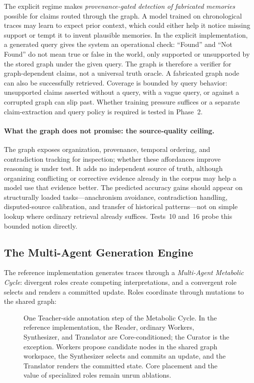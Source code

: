 The explicit regime makes \emph{provenance-gated detection of fabricated
memories} possible for claims routed through the graph. A model trained on
chronological traces may learn to expect prior context, which could either
help it notice missing support or tempt it to invent plausible memories. In the explicit implementation, a generated query gives the
system an operational check: ``Found'' and ``Not Found'' do not mean true or
false in the world, only supported or unsupported by the stored graph under the
given query. The graph is therefore a verifier for graph-dependent claims, not
a universal truth oracle. A fabricated graph node can also be successfully
retrieved. Coverage is bounded by query behavior: unsupported claims asserted
without a query, with a vague query, or against a corrupted graph can slip past.
Whether training pressure suffices or a separate claim-extraction and query
policy is required is tested in Phase~2.

\paragraph{What the graph does not promise: the source-quality ceiling.} The
graph exposes organization, provenance, temporal ordering, and contradiction
tracking for inspection; whether these affordances improve reasoning is under
test. It adds no independent source of truth, although organizing conflicting
or corrective evidence already in the corpus may help a model use that evidence
better. The predicted accuracy gains should appear on structurally loaded tasks---anachronism avoidance,
contradiction handling, disputed-source calibration, and transfer of historical
patterns---not on simple lookup where ordinary retrieval already suffices.
Tests~10 and~16 probe this bounded notion directly.


\subsection{The Multi-Agent Generation Engine}
\label{sec:multi-agent}

The reference implementation generates traces through a \emph{Multi-Agent
Metabolic Cycle}: divergent roles create competing interpretations, and a
convergent role selects and renders a committed update. Roles coordinate through
mutations to the shared graph:

\begin{figure}[h]
    \centering
    \resizebox{\textwidth}{!}{}
    \caption{One Teacher-side annotation step of the Metabolic Cycle. In the reference implementation, the Reader, ordinary Workers, Synthesizer, and Translator are Core-conditioned; the Curator is the exception. Workers propose candidate nodes in the shared graph workspace, the Synthesizer selects and commits an update, and the Translator renders the committed state. Core placement and the value of specialized roles remain unrun ablations.}
    \label{fig:metabolic-cycle}
\end{figure}
\FloatBarrier

